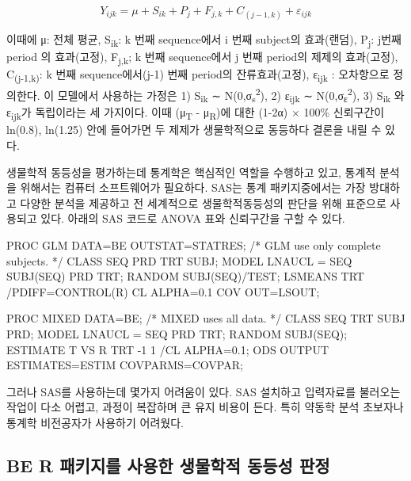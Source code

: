 \documentclass[
  11pt,
  krantz2, a4paper, twoside]{krantz}
\newenvironment{Shaded}{\begin{snugshade}}{\end{snugshade}}
\newcommand{\NormalTok}[1]{#1}
\theoremstyle{definition}
\theoremstyle{definition}
\theoremstyle{definition}
\theoremstyle{definition}
\theoremstyle{remark}
\begin{document}
\[
Y_{ijk} = \mu + S_{ik} + P_{j} + F_{j,k} + C_{(j-1,k)} + \varepsilon_{ijk}
\]

이때에 μ: 전체 평균, S\textsubscript{ik}: k 번째 sequence에서 i 번째 subject의 효과(랜덤), P\textsubscript{j}: j번째 period 의 효과(고정), F\textsubscript{j,k}; k 번째 sequence에서 j 번째 period의 제제의 효과(고정), C\textsubscript{(j-1,k)}: k 번째 sequence에서(j-1) 번째 period의 잔류효과(고정), ε\textsubscript{ijk} : 오차항으로 정의한다.
이 모델에서 사용하는 가정은 1) S\textsubscript{ik} ∼ N(0,σ\textsubscript{s}\textsuperscript{2}), 2) ε\textsubscript{ijk} ∼ N(0,σ\textsubscript{ε}\textsuperscript{2}), 3) S\textsubscript{ik} 와 ε\textsubscript{ijk}가 독립이라는 세 가지이다. 이때 (μ\textsubscript{T} - μ\textsubscript{R})에 대한 (1-2α) × 100\% 신뢰구간이 ln(0.8), ln(1.25) 안에 들어가면 두 제제가 생물학적으로 동등하다 결론을 내릴 수 있다.

생물학적 동등성을 평가하는데 통계학은 핵심적인 역할을 수행하고 있고, 통계적 분석을 위해서는 컴퓨터 소프트웨어가 필요하다. SAS는 통계 패키지중에서는 가장 방대하고 다양한 분석을 제공하고 전 세계적으로 생물학적동등성의 판단을 위해 표준으로 사용되고 있다. 아래의 SAS 코드로 ANOVA 표와 신뢰구간을 구할 수 있다.

\begin{Shaded}
\begin{Highlighting}[]
\NormalTok{PROC GLM DATA=BE OUTSTAT=STATRES; /* GLM use only complete subjects. */}
\NormalTok{CLASS SEQ PRD TRT SUBJ;}
\NormalTok{MODEL LNAUCL = SEQ SUBJ(SEQ) PRD TRT;}
\NormalTok{RANDOM SUBJ(SEQ)/TEST;}
\NormalTok{LSMEANS TRT /PDIFF=CONTROL(\textquotesingle{}R\textquotesingle{}) CL ALPHA=0.1 COV OUT=LSOUT;}

\NormalTok{PROC MIXED DATA=BE; /* MIXED uses all data. */}
\NormalTok{CLASS SEQ TRT SUBJ PRD;}
\NormalTok{MODEL LNAUCL = SEQ PRD TRT;}
\NormalTok{RANDOM SUBJ(SEQ);}
\NormalTok{ESTIMATE \textquotesingle{}T VS R\textquotesingle{} TRT {-}1 1 /CL ALPHA=0.1;}
\NormalTok{ODS OUTPUT ESTIMATES=ESTIM COVPARMS=COVPAR;}
\end{Highlighting}
\end{Shaded}

그러나 SAS를 사용하는데 몇가지 어려움이 있다. SAS 설치하고 입력자료를 불러오는 작업이 다소 어렵고, 과정이 복잡하며 큰 유지 비용이 든다. 특히 약동학 분석 초보자나 통계학 비전공자가 사용하기 어려웠다. 

\hypertarget{be-r-uxd328uxd0a4uxc9c0uxb97c-uxc0acuxc6a9uxd55c-uxc0dduxbb3cuxd559uxc801-uxb3d9uxb4f1uxc131-uxd310uxc815}{%
\subsection{\texorpdfstring{BE R 패키지를 사용한 생물학적 동등성 판정}{BE R 패키지를 사용한 생물학적 동등성 판정}}\label{be-r-uxd328uxd0a4uxc9c0uxb97c-uxc0acuxc6a9uxd55c-uxc0dduxbb3cuxd559uxc801-uxb3d9uxb4f1uxc131-uxd310uxc815}}
\end{document}

